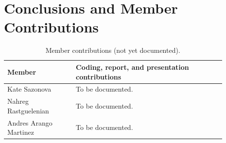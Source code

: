 \section{Conclusions and Member Contributions}

\begin{table}[htbp]
\centering
\small
\begin{tabular}{|>{\raggedright\arraybackslash}p{0.28\linewidth}|
                 >{\raggedright\arraybackslash}p{0.61\linewidth}|}
\hline
\textbf{Member} & \textbf{Coding, report, and presentation contributions} \\
\hline
Kate Sazonova & To be documented. \\
\hline
Nahreg Rastguelenian & To be documented. \\
\hline
Andres Arango Martinez & To be documented. \\
\hline
\end{tabular}
\caption{Member contributions (not yet documented).}
\end{table}
